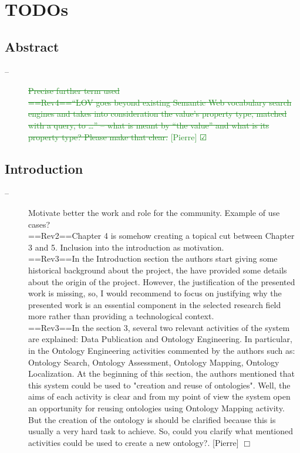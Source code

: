 \documentclass[a4paper,notitlepage]{article}
\newcommand\todo[2]{\item[--] #1 \hfill[#2] $\Box$}%
\newcommand\done[2]{ \item[--]\textcolor{ForestGreen}{\st{#1}} \hfill\textcolor{ForestGreen}{[#2] $\CheckedBox$}}%
\begin{document}
\section{TODOs}

\subsection{Abstract}
\begin{description}
 \done{Precise further term used\\
==Rev4==“LOV goes beyond existing Semantic Web vocabulary search engines and takes into consideration the value’s property type, matched with a query, to …” – what is meant by “the value” and what is its property type? Please make that clear.}{Pierre}
\end{description}


\subsection{Introduction}
\begin{description}
 \todo{Motivate better the work and role for the community. Example of use cases?\\
==Rev2==Chapter 4 is somehow creating a topical cut between Chapter 3 and 5. Inclusion into the introduction as motivation.\\
==Rev3==In the Introduction section the authors start giving some historical background about the project, the have provided some details about the origin of the project. However, the justification of the presented work is missing, so, I would recommend to focus on justifying why the presented work is an essential component in the selected research field more rather than providing a technological context.\\
==Rev3==In the section 3, several two relevant activities of the system are explained: Data Publication and Ontology Engineering. In particular, in the Ontology Engineering activities commented by the authors such as: Ontology Search, Ontology Assessment, Ontology Mapping, Ontology Localization. At the beginning of this section, the authors mentioned that this system could be used to "creation and reuse of ontologies". Well, the aims of each activity is clear and from my point of view the system open an opportunity for reusing ontologies using Ontology Mapping activity. But the creation of the ontology is should be clarified because this is usually a very hard task to achieve. So, could you clarify what mentioned activities could be used to create a new ontology?.}{Pierre}
\end{description}
\end{document}
